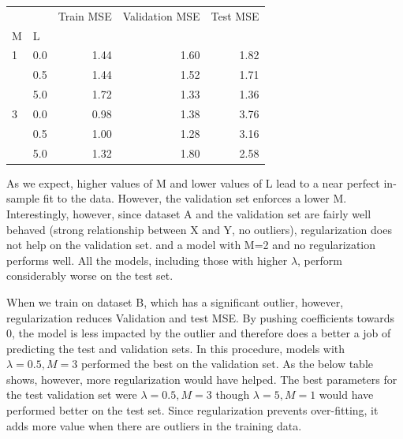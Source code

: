 \documentclass[10pt]{article}
\begin{document}
\begin{tabular}{llrrr}
\toprule
  &     &  Train MSE &  Validation MSE &  Test MSE \\
M & L &            &                 &           \\
\midrule
1 & 0.0 &       1.44 &            1.60 &      1.82 \\
  & 0.5 &       1.44 &            1.52 &      1.71 \\
  & 5.0 &       1.72 &            1.33 &      1.36 \\
3 & 0.0 &       0.98 &            1.38 &      3.76 \\
  & 0.5 &       1.00 &            1.28 &      3.16 \\
  & 5.0 &       1.32 &            1.80 &      2.58 \\
\bottomrule
\end{tabular}
As we expect, higher values of M and lower values of L lead to a near perfect in-sample fit to the data. However, the validation set enforces a lower M. Interestingly, however, since dataset A and the validation set are fairly well behaved (strong relationship between X and Y, no outliers), regularization does not help on the validation set. and a model with M=2 and no regularization performs well. All the models, including those with higher $\lambda$, perform considerably worse on the test set.

When we train on dataset B, which has a significant outlier, however, regularization reduces Validation and test MSE. By pushing coefficients towards 0, the model is less impacted by the outlier and therefore does a better a job of predicting the test and validation sets. In this procedure, models with  $\lambda = 0.5, M=3$ performed the best on the validation set. As the below table shows, however, more regularization would have helped. The best parameters for the test validation set  were  $\lambda = 0.5, M=3$  though $\lambda = 5, M=1$ would have performed better on the test set.  Since regularization prevents over-fitting, it adds more value when there are outliers in the training data. 
\end{document}
